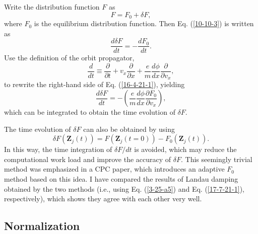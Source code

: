 \documentclass{article}
\begin{document}
Write the distribution function $F$ as
\begin{equation}
  F = F_0 + \delta F,
\end{equation}
where $F_0$ is the equilibrium distribution function. Then Eq. (\ref{10-10-3})
is written as
\begin{equation}
  \label{16-4-21-1} \frac{d \delta F}{d t} = - \frac{d F_0}{d t} .
\end{equation}
Use the definition of the orbit propagator,
\begin{equation}
  \frac{d}{d t} \equiv \frac{\partial}{\partial t} + v_x
  \frac{\partial}{\partial x} + \frac{e}{m}  \frac{d \phi}{d x} 
  \frac{\partial}{\partial v_x},
\end{equation}
to rewrite the right-hand side of Eq. (\ref{16-4-21-1}), yielding
\begin{equation}
  \label{3-25-a5} \frac{d \delta F}{d t} = - \left( \frac{e}{m}  \frac{d
  \phi}{d x}  \frac{\partial F_0}{\partial v_x} \right),
\end{equation}
which can be integrated to obtain the time evolution of $\delta F$.

The time evolution of $\delta F$ can also be obtained by using
\begin{equation}
  \label{17-7-21-1} \delta F (\mathbf{Z}_j (t)) = F (\mathbf{Z}_j (t = 0)) -
  F_0 (\mathbf{Z}_j (t)) .
\end{equation}
In this way, the time integration of $\delta F / d t$ is avoided, which may
reduce the computational work load and improve the accuracy of $\delta F$.
This seemingly trivial method was emphasized in a CPC
paper{\cite{allfrey2003}}, which introduces an adaptive $F_0$ method based on
this idea. I have compared the results of Landau damping obtained by the two
methods (i.e., using Eq. (\ref{3-25-a5}) and Eq. (\ref{17-7-21-1}),
respectively), which shows they agree with each other very well.

\subsection{Normalization}\label{3-25-a4}
\end{document}
